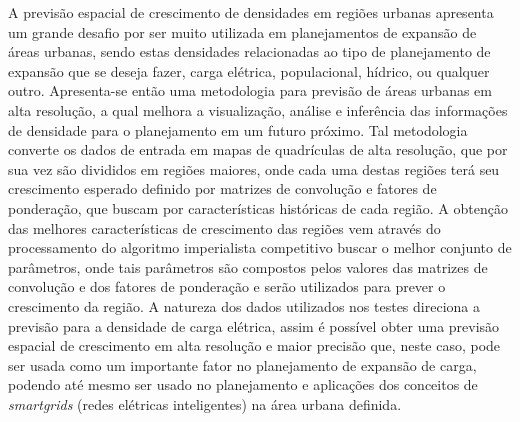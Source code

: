 \setlength{\absparsep}{18pt} %
\begin{resumo}

A previsão espacial de crescimento de densidades em regiões urbanas apresenta um grande desafio por ser muito utilizada em planejamentos de expansão de áreas urbanas, sendo estas densidades relacionadas ao tipo de planejamento de expansão que se deseja fazer, carga elétrica, populacional, hídrico, ou qualquer outro. Apresenta-se então uma metodologia para previsão de áreas urbanas em alta resolução, a qual melhora a visualização, análise e inferência das informações de densidade para o planejamento em um futuro próximo. Tal metodologia converte os dados de entrada em mapas de quadrículas de alta resolução, que por sua vez são divididos em regiões maiores, onde cada uma destas regiões terá seu crescimento esperado definido por matrizes de convolução e fatores de ponderação, que buscam por características históricas de cada região. A obtenção das melhores características de crescimento das regiões vem através do processamento do algoritmo imperialista competitivo buscar o melhor conjunto de parâmetros, onde tais parâmetros são compostos pelos valores das matrizes de convolução e dos fatores de ponderação e serão utilizados para prever o crescimento da região. A natureza dos dados utilizados nos testes direciona a previsão para a densidade de carga elétrica, assim é possível obter uma previsão espacial de crescimento em alta resolução e maior precisão que, neste caso, pode ser usada como um importante fator no planejamento de expansão de carga, podendo até mesmo ser usado no planejamento e aplicações dos conceitos de \emph{smartgrids} (redes elétricas inteligentes) na área urbana definida.

\end{resumo}

